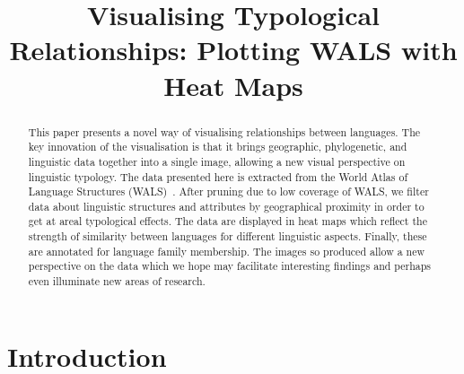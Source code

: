 \documentclass[11pt]{article}
\title{Visualising Typological Relationships: Plotting WALS with Heat Maps}
\date{}
\begin{document}
\maketitle


\begin{abstract}
This paper presents a novel way of visualising relationships between languages. The key innovation of the visualisation is that it brings geographic, phylogenetic, and linguistic data together into a single image, allowing a new visual perspective on linguistic typology. The data presented here is extracted from the World Atlas of Language Structures (WALS)~\cite{wals-2011}. After pruning due to low coverage of WALS, we filter data about linguistic structures and attributes by geographical proximity in order to get at areal typological effects. The data are displayed in heat maps which reflect the strength of similarity between languages for different linguistic aspects. Finally, these are annotated for language family membership. The images so produced allow a new perspective on the data which we hope may facilitate interesting findings and perhaps even illuminate new areas of research.
\end{abstract}


\section{Introduction}
\end{document}
